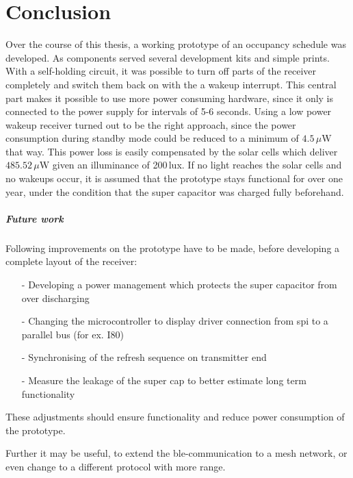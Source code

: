 \chapter{Conclusion}

Over the course of this thesis, a working prototype of an occupancy schedule was developed.
As components served several development kits and simple prints.
With a self-holding circuit, it was possible to turn off parts of the receiver completely and switch them back on with the a wakeup interrupt.
This central part makes it possible to use more power consuming hardware, since it only is connected to the power supply for intervals of 5-6 seconds.
Using a low power wakeup receiver turned out to be the right approach, since the power consumption during standby mode could be reduced to a minimum of $4.5\,\mu\text{W}$ that way.
This power loss is easily compensated by the solar cells which deliver $485.52\,\mu\text{W}$ given an illuminance of 200\,lux.
If no light reaches the solar cells and no wakeups occur, it is assumed that the prototype stays functional for over one year, under the condition that the super capacitor was charged fully beforehand.

\paragraph{Future work}
Following improvements on the prototype have to be made, before developing a complete layout of the receiver:
\begin{itemize}
	\item[-] Developing a power management which protects the super capacitor from over discharging
	\item[-] Changing the microcontroller to display driver connection from \acs{spi} to a parallel bus (for ex. I80)
	\item[-] Synchronising of the refresh sequence on transmitter end
	\item[-] Measure the leakage of the super cap to better estimate long term functionality
\end{itemize}
These adjustments should ensure functionality and reduce power consumption of the prototype.

Further it may be useful, to extend the \acs{ble}-communication to a mesh network, or even change to a different protocol with more range.